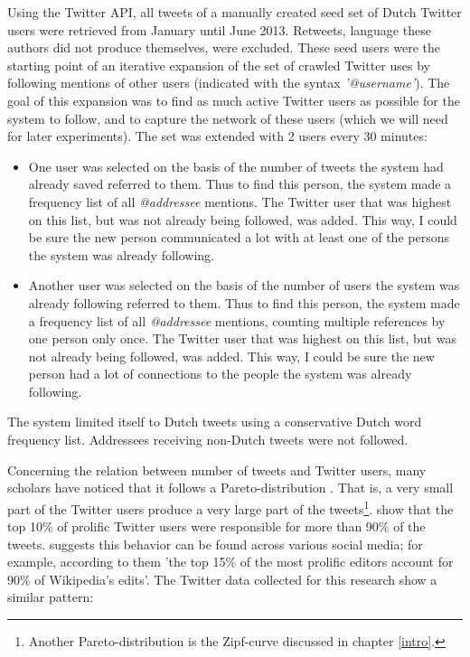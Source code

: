 \documentclass[12pt]{article}
\begin{document}
Using the Twitter API, all tweets of a manually created seed set of Dutch Twitter users were retrieved from January until June 2013. Retweets, language these authors did not produce themselves, were excluded. These seed users were the starting point of an iterative expansion of the set of crawled Twitter uses by following mentions of other users (indicated with the syntax \emph{'@username'}). The goal of this expansion was to find as much active Twitter users as possible for the system to follow, and to capture the network of these users (which we will need for later experiments). The set was extended with 2 users every 30 minutes:

\begin{itemize}
\item One user was selected on the basis of the number of tweets the system had already saved referred to them. Thus to find this person, the system made a frequency list of all \emph{@addressee} mentions. The Twitter user that was highest on this list, but was not already being followed, was added. This way, I could be sure the new person communicated a lot with at least one of the persons the system was already following.
\item Another user was selected on the basis of the number of users the system was already following referred to them. Thus to find this person, the system made a frequency list of all \emph{@addressee} mentions, counting multiple references by one person only once. The Twitter user that was highest on this list, but was not already being followed, was added. This way, I could be sure the new person had a lot of connections to the people the system was already following.
\end{itemize}

The system limited itself to Dutch tweets using a conservative Dutch word frequency list. Addressees receiving non-Dutch tweets were not followed.

Concerning the relation between number of tweets and Twitter users, many scholars have noticed that it follows a Pareto-distribution . That is, a very small part of the Twitter users produce a very large part of the tweets\footnote{Another Pareto-distribution is the Zipf-curve discussed in chapter \ref{intro}.}.  show that the top 10\% of prolific Twitter users were responsible for more than 90\% of the tweets.  suggests this behavior can be found across various social media; for example, according to them 'the top 15\% of the most prolific editors account for 90\% of Wikipedia's edits'. The Twitter data collected for this research show a similar pattern:
\end{document}
